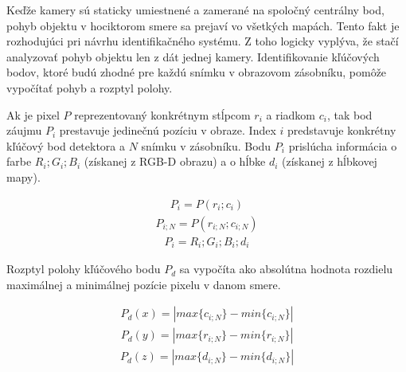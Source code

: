 Keďže kamery sú staticky umiestnené a zamerané na spoločný centrálny bod, pohyb objektu v hociktorom smere sa prejaví vo všetkých mapách. Tento fakt je rozhodujúci pri návrhu identifikačného systému. Z toho logicky vyplýva, že stačí analyzovať pohyb objektu len z dát jednej kamery. Identifikovanie kľúčových bodov, ktoré budú zhodné pre každú snímku v obrazovom zásobníku, pomôže vypočítať pohyb a rozptyl polohy. \newline

Ak je pixel $P$ reprezentovaný konkrétnym stĺpcom $r_{i}$ a riadkom $c_{i}$, tak bod záujmu $P_{i}$ prestavuje jedinečnú pozíciu v obraze. Index $i$ predstavuje konkrétny kľúčový bod detektora a $N$ snímku v zásobníku. Bodu $P_{i}$ prislúcha informácia o farbe $R_{i};G_{i};B_{i}$ (získanej z RGB-D obrazu) a o hĺbke $d_{i}$ (získanej z hĺbkovej mapy).

\begin{equation}
\label{eq:pixels:a}
\begin{aligned}
P_{i}=P\left(r_{i};c_{i}\right)
\end{aligned}
\end{equation}
\begin{equation}
\label{eq:pixels:b}
\begin{aligned}
P_{i;N}=P\left(r_{i;N};c_{i;N}\right)
\end{aligned}
\end{equation}
\begin{equation}
\label{eq:pixels:c}
\begin{aligned}
P_{i}=R_{i};G_{i};B_{i};d_{i}
\end{aligned}
\end{equation}

Rozptyl polohy kľúčového bodu $P_d$ sa vypočíta ako absolútna hodnota rozdielu maximálnej a minimálnej pozície pixelu v danom smere. 

\begin{equation}
\label{eq:pixels:d}
\begin{aligned}
P_d\left(x\right)=\left|  max\lbrace c_{i;N} \rbrace -min\lbrace c_{i;N} \rbrace \right| 
\end{aligned}
\end{equation}
\begin{equation}
\label{eq:pixels:e}
\begin{aligned}
P_d\left(y\right)=\left|  max\lbrace r_{i;N} \rbrace -min\lbrace r_{i;N} \rbrace \right| 
\end{aligned}
\end{equation}
\begin{equation}
\label{eq:pixels:f}
\begin{aligned}
P_d\left(z\right)=\left|  max\lbrace d_{i;N} \rbrace -min\lbrace d_{i;N} \rbrace \right| 
\end{aligned}
\end{equation}

